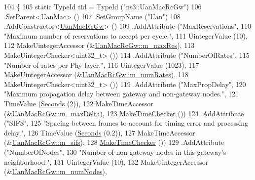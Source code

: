 \begin{DoxyCode}
104 \{
105   \textcolor{keyword}{static} TypeId tid = TypeId (\textcolor{stringliteral}{"ns3::UanMacRcGw"})
106     .SetParent<UanMac> ()
107     .SetGroupName (\textcolor{stringliteral}{"Uan"})
108     .AddConstructor<\hyperlink{classns3_1_1UanMacRcGw_a299426e341f023ae7bde2f62e4269d90}{UanMacRcGw}> ()
109     .AddAttribute (\textcolor{stringliteral}{"MaxReservations"},
110                    \textcolor{stringliteral}{"Maximum number of reservations to accept per cycle."},
111                    UintegerValue (10),
112                    MakeUintegerAccessor (&\hyperlink{classns3_1_1UanMacRcGw_a14fb67143992d3c9f81e27f5647045e1}{UanMacRcGw::m\_maxRes}),
113                    MakeUintegerChecker<uint32\_t> ())
114     .AddAttribute (\textcolor{stringliteral}{"NumberOfRates"},
115                    \textcolor{stringliteral}{"Number of rates per Phy layer."},
116                    UintegerValue (1023),
117                    MakeUintegerAccessor (&\hyperlink{classns3_1_1UanMacRcGw_a86339396f55693d151f8c217bfcf6149}{UanMacRcGw::m\_numRates}),
118                    MakeUintegerChecker<uint32\_t> ())
119     .AddAttribute (\textcolor{stringliteral}{"MaxPropDelay"},
120                    \textcolor{stringliteral}{"Maximum propagation delay between gateway and non-gateway nodes."},
121                    TimeValue (\hyperlink{group__timecivil_ga33c34b816f8ff6628e33d5c8e9713b9e}{Seconds} (2)),
122                    MakeTimeAccessor (&\hyperlink{classns3_1_1UanMacRcGw_a5134119f83113902bc01101e46d66542}{UanMacRcGw::m\_maxDelta}),
123                    \hyperlink{group__time_ga7032965bd4afa578691d88c09e4481c1}{MakeTimeChecker} ())
124     .AddAttribute (\textcolor{stringliteral}{"SIFS"},
125                    \textcolor{stringliteral}{"Spacing between frames to account for timing error and processing delay."},
126                    TimeValue (\hyperlink{group__timecivil_ga33c34b816f8ff6628e33d5c8e9713b9e}{Seconds} (0.2)),
127                    MakeTimeAccessor (&\hyperlink{classns3_1_1UanMacRcGw_a563f1bf04fd1d1cf01c6590329e58b4c}{UanMacRcGw::m\_sifs}),
128                    \hyperlink{group__time_ga7032965bd4afa578691d88c09e4481c1}{MakeTimeChecker} ())
129     .AddAttribute (\textcolor{stringliteral}{"NumberOfNodes"},
130                    \textcolor{stringliteral}{"Number of non-gateway nodes in this gateway's neighborhood."},
131                    UintegerValue (10),
132                    MakeUintegerAccessor (&\hyperlink{classns3_1_1UanMacRcGw_a00185ef8e5203de223265077a3ad2cf4}{UanMacRcGw::m\_numNodes}),

\end{DoxyCode}
